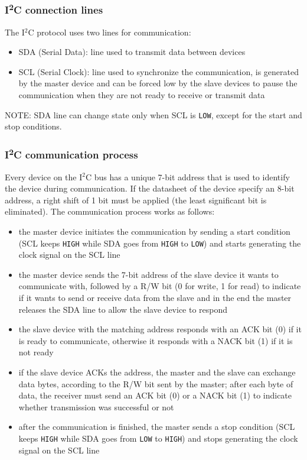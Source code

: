 \subsubsection*{I\texorpdfstring{\textsuperscript{2}}{2}C connection lines}
The I\(^2\)C protocol uses two lines for communication:
\begin{itemize}
	\item SDA (Serial Data): line used to transmit data between devices
	\item SCL (Serial Clock): line used to synchronize the communication, is generated by the master device and can be forced
	low by the slave devices to pause the communication when they are not ready to receive or transmit data
\end{itemize}
NOTE: SDA line can change state only when SCL is \texttt{LOW}, except for the start and stop conditions.

\subsubsection*{I\texorpdfstring{\textsuperscript{2}}{2}C communication process}
Every device on the I\(^2\)C bus has a unique 7-bit address that is used to identify the device during communication. If the
datasheet of the device specify an 8-bit address, a right shift of 1 bit must be applied (the least significant bit is eliminated).
The communication process works as follows:
\begin{itemize}
	\item the master device initiates the communication by sending a start condition (SCL keeps \texttt{HIGH} while SDA goes
	from \texttt{HIGH} to \texttt{LOW}) and starts generating the clock signal on the SCL line
	\item the master device sends the 7-bit address of the slave device it wants to communicate with, followed by a R/W bit
	(0 for write, 1 for read) to indicate if it wants to send or receive data from the slave and in the end the master
	releases the SDA line to allow the slave device to respond
	\item the slave device with the matching address responds with an ACK bit (0) if it is ready to communicate, otherwise
	it responds with a NACK bit (1) if it is not ready
	\item if the slave device ACKs the address, the master and the slave can exchange data bytes, according to the R/W bit
	sent by the master; after each byte of data, the receiver must send an ACK bit (0) or a NACK bit (1) to indicate whether
	transmission was successful or not
	\item after the communication is finished, the master sends a stop condition (SCL keeps \texttt{HIGH} while SDA goes
	from \texttt{LOW} to \texttt{HIGH}) and stops generating the clock signal on the SCL line
\end{itemize}

